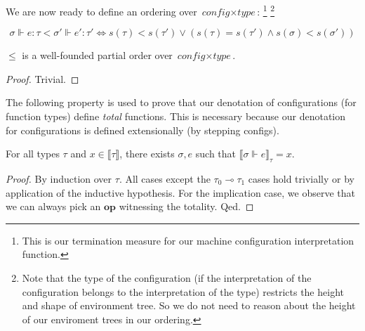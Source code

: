 \begin{definition}[Orderings]
  We are now ready to define an ordering over $\textit{config} \times
  \textit{type}$:
  \footnote{This is our termination measure for our machine configuration
  interpretation function.}
  \footnote{Note that the type of the configuration (if the interpretation of
  the configuration belongs to the interpretation of the type) restricts the
  height and shape of environment tree. So we do not need to reason about the
  height of our enviroment trees in our ordering.}

  \begin{equation}
    \sigma \Vdash e : \tau < \sigma' \Vdash e' : \tau' \iff
    s(\tau) < s(\tau') \lor (s(\tau) = s(\tau') \land s(\sigma) < s(\sigma'))
  \end{equation}

\end{definition}

\begin{lemma}
  $\leq$ is a well-founded partial order over $\textit{config} \times
  \textit{type}$.
\end{lemma}
\begin{proof}
  Trivial.
\end{proof}


The following property is used to prove that our denotation of configurations
(for function types) define \textit{total} functions. This is necessary because
our denotation for configurations is defined extensionally (by stepping
configs).

\begin{lemma}
  For all types $\tau$ and $x \in \llbracket \tau \rrbracket$, there exists
  $\sigma, e$ such that $\llbracket \sigma \Vdash e \rrbracket_{\tau} = x$.
\end{lemma}
\begin{proof}
  By induction over $\tau$. All cases except the $\tau_0 \multimap \tau_1$ cases
  hold trivially or by application of the inductive hypothesis. For the
  implication case, we observe that we can always pick an $\textbf{op}$
  witnessing the totality. Qed.
\end{proof}

